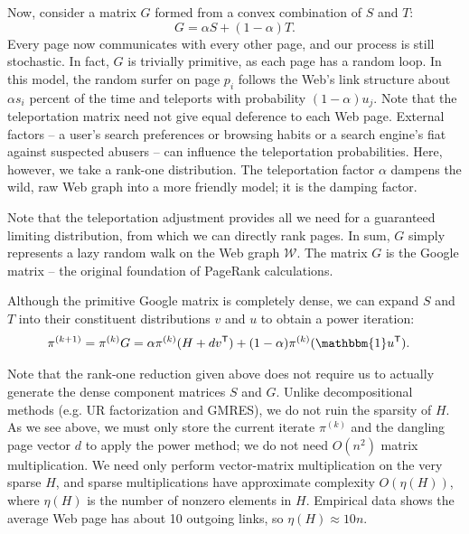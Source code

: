 \documentclass[12pt]{article}
\newcommand{\transpose}[1]{#1^{\mathsf{T}}}
\newcommand{\iterate}[2]{#1^{(#2)}}
\begin{document}
Now, consider a matrix $G$ formed from a convex combination of $S$ and $T$:
\begin{equation}
  \label{eqn:google_matrix}
  G = \alpha S + (1-\alpha)T.
\end{equation}
Every page now communicates with every other page, and our process is still
stochastic. In fact, $G$ is trivially primitive, as each page has a random loop.
In this model, the random surfer on page $p_i$ follows the Web's link structure
about $\alpha s_i$ percent of the time and teleports with probability
$(1-\alpha) u_j$. Note that the teleportation matrix need not give equal
deference to each Web page. External factors -- a user's search preferences or
browsing habits or a search engine's fiat against suspected abusers -- can
influence the teleportation probabilities. Here, however, we take a rank-one
distribution. The teleportation factor $\alpha$ dampens the wild, raw Web graph
into a more friendly model; it is the damping factor.

Note that the teleportation adjustment provides all we need for a guaranteed
limiting distribution, from which we can directly rank pages. In sum, $G$ simply
represents a lazy random walk on the Web graph $\mathcal{W}$. The matrix $G$ is
the Google matrix -- the original foundation of PageRank calculations.

Although the primitive Google matrix is completely dense, we can expand $S$ and
$T$ into their constituent distributions $v$ and $u$ to obtain a power
iteration:
\begin{align*}
  \iterate{\pi}{k+1} &= \iterate{\pi}{k} G
                     = \alpha \iterate{\pi}{k} (H + d \transpose{v}) + (1 - \alpha) \iterate{\pi}{k} (\mathbbm{1} \transpose{u}).
\end{align*}

Note that the rank-one reduction given above does not require us to actually
generate the dense component matrices $S$ and $G$. Unlike decompositional
methods (e.g. UR factorization and GMRES), we do not ruin the sparsity of $H$.
As we see above, we must only store the current iterate $\iterate{\pi}{k}$ and
the dangling page vector $d$ to apply the power method; we do not need $O(n^2)$
matrix multiplication. We need only perform vector-matrix multiplication on the
very sparse $H$, and sparse multiplications have approximate complexity
$O(\eta(H))$, where $\eta(H)$ is the number of nonzero elements in $H$.
Empirical data shows the average Web page has about 10 outgoing links, so
$\eta(H) \approx 10n$.
\end{document}
